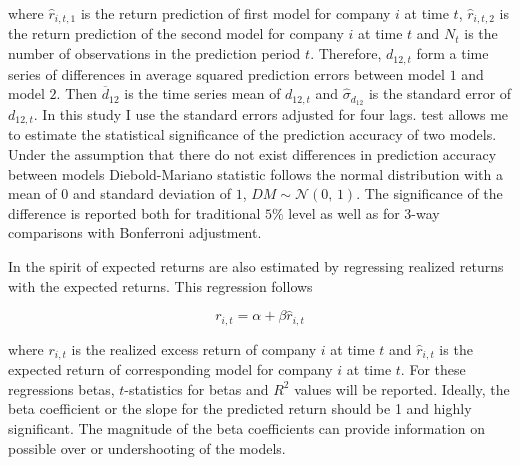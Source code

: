 \documentclass[12pt]{article}
\begin{document}
where $\hat r_{i, t, 1}$ is the return prediction of first model for company $i$ at time $t$, $\hat r_{i, t, 2}$ is the return prediction of the second model  for company $i$ at time $t$ and $N_t$ is the number of observations in the prediction period $t$.\footnotemark {} Therefore, $d_{12, t}$ form a time series of differences in average squared prediction errors between model $1$ and model $2$. Then $\overline{d}_{12}$ is the time series mean of $d_{12, t}$ and $\hat \sigma_{d_{12}}$ is the \citet{Newey1987} standard error of $d_{12, t}$.\footnotemark {} In this study I use the \citeauthor{Newey1987} standard errors adjusted for four lags. \citet{Diebold1995} test allows me to estimate the statistical significance of the prediction accuracy of two models. Under the assumption that there do not exist differences in prediction accuracy between models Diebold-Mariano statistic follows the normal distribution with a mean of $0$ and standard deviation of $1$, $DM \sim \mathcal{N}(0,\, 1)$. The significance of the difference is reported both for traditional $5\%$ level as well as for 3-way comparisons with Bonferroni adjustment. \par

In the spirit of \citet{Lewellen2015} expected returns are also estimated by regressing realized returns with the expected returns. This regression follows \par

\begin{equation}
\label{eq:realizedRegression}
r_{i, t} = \alpha + \beta \hat r_{i, t}
\end{equation}

where $r_{i, t}$ is the realized excess return of company $i$ at time $t$ and $\hat r_{i, t}$ is the expected return of corresponding model for company $i$ at time $t$.\footnotemark {} For these regressions betas, $t$-statistics for betas and $R^2$ values will be reported. Ideally, the beta coefficient or the slope for the predicted return should be 1 and highly significant. The magnitude of the beta coefficients can provide information on possible over or undershooting of the models. \par
\end{document}
